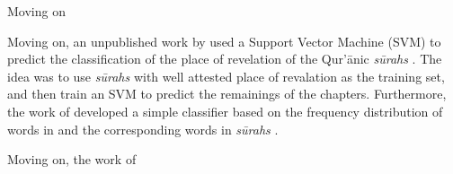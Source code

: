 Moving on 

Moving on, an unpublished work by  used a Support Vector Machine (SVM) to predict the classification of the place of revelation of the Qur'\=anic \textit{s\=urahs} . The idea was to use \textit{s\=urahs}  with well attested place of revalation as the training set, and then train an SVM to predict the remainings of the chapters. Furthermore, the work of  developed a simple classifier based on the frequency distribution of words in   and the corresponding words in \textit{s\=urahs} .

Moving on, the work of 